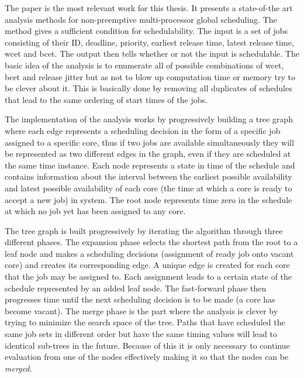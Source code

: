\documentclass{kththesis}
\begin{document}
The paper \parencite{nasri_response-time_2018} is the most relevant work for this thesis. It
presents a state-of-the art analysis methods for non-preemptive multi-processor global scheduling.
The method gives a sufficient condition for schedulability. The input is a set of jobs consisting of
their ID, deadline, priority, earliest release time, latest release time, \acrshort{wcet} and
\acrshort{bcet}.  The output then tells whether or not the input is schedulable. The basic idea of
the analysis is to enumerate all of possible combinations of \acrshort{wcet}, \acrshort{bcet} and
release jitter but as not to blow up computation time or memory try to be clever about it. This is
basically done by removing all duplicates of schedules that lead to the same ordering of start times
of the jobs.

The implementation of the analysis works by progressively building a tree graph where each edge
represents a scheduling decision in the form of a specific job assigned to a specific core, thus if
two jobs are available simultaneously they will be represented as two different edges in the graph,
even if they are scheduled at the same time instance. Each node represents a state in time of the
schedule and contains information about the interval between the earliest possible availability and
latest possible availability of each core (the time at which a core is ready to accept a new job) in
system. The root node represents time zero in the schedule at which no job yet has been assigned to
any core. 

The tree graph is built progressively by iterating the algorithm through three different phases.
The expansion phase selects the shortest path from the root to a leaf node and makes a scheduling
decisions (assignment of ready job onto vacant core) and creates its corresponding edge. A unique
edge is created for each core that the job may be assigned to. Each assignment leads to a certain
state of the schedule represented by an added leaf node. The fast-forward phase then progresses 
time until the next scheduling decision is to be made (a core has become vacant). The merge phase is
the part where the analysis is clever by trying to minimize the search space of the tree. Paths that
have scheduled the same job sets in different order but have the same timing values will lead to
identical sub-trees in the future. Because of this it is only necessary to continue evaluation from
one of the nodes effectively making it so that the nodes can be \textit{merged}.
\end{document}

